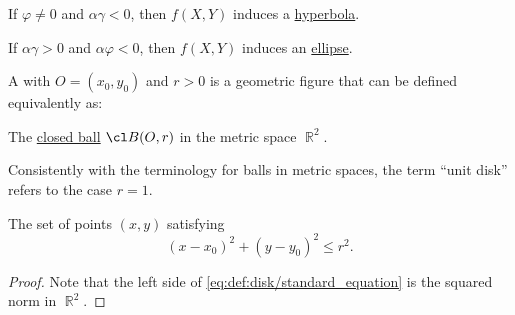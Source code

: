 \begin{algorithm}
\begin{thmenum}
\begin{thmenum}
       If \( \varphi \neq 0 \) and \( \alpha \gamma < 0 \), then \( f(X, Y) \) induces a \hyperref[def:hyperbola]{hyperbola}.

       If \( \alpha \gamma > 0 \) and \( \alpha \varphi < 0 \), then \( f(X, Y) \) induces an \hyperref[def:ellipse]{ellipse}.
    \end{thmenum}
  \end{thmenum}
\end{algorithm}

\begin{definition}\label{def:disk}
  A  with  \( O = (x_0, y_0) \) and  \( r > 0 \) is a geometric figure that can be defined equivalently as:

  \begin{thmenum}
     The \hyperref[def:metric_space/ball]{closed ball} \( \cl B(O, r) \) in the metric space \( \BbbR^2 \).

    Consistently with the terminology for balls in metric spaces, the term \enquote{unit disk} refers to the case \( r = 1 \).

     The set of points \( (x, y) \) satisfying
    \begin{equation}\label{eq:def:disk/standard_equation}
      (x - x_0)^2 + (y - y_0)^2 \leq r^2.
    \end{equation}
  \end{thmenum}
\end{definition}
\begin{proof}
  Note that the left side of \eqref{eq:def:disk/standard_equation} is the squared norm in \( \BbbR^2 \).
\end{proof}

